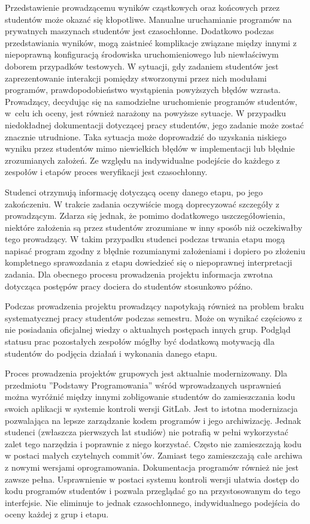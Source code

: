 Przedstawienie prowadzącemu wyników cząstkowych oraz końcowych przez studentów może okazać się kłopotliwe.
Manualne uruchamianie programów na prywatnych maszynach studentów jest czasochłonne.
Dodatkowo podczas przedstawiania wyników, mogą zaistnieć komplikacje związane między innymi z niepoprawną konfiguracją środowiska uruchomieniowego lub niewłaściwym doborem przypadków testowych.
W sytuacji, gdy zadaniem studentów jest zaprezentowanie interakcji pomiędzy stworzonymi przez nich modułami programów, prawdopodobieństwo wystąpienia powyższych błędów wzrasta.
Prowadzący, decydując się na samodzielne uruchomienie programów studentów, w~celu ich oceny, jest również narażony na powyższe sytuacje.
W przypadku niedokładnej dokumentacji dotyczącej pracy studentów, jego zadanie może zostać znacznie utrudnione.
Taka sytuacja może doprowadzić do uzyskania niskiego wyniku przez studentów mimo niewielkich błędów w implementacji lub błędnie zrozumianych założeń.
Ze względu na indywidualne podejście do każdego z zespołów i etapów proces weryfikacji jest czasochłonny.

Studenci otrzymują informację dotyczącą oceny danego etapu, po jego zakończeniu.
W trakcie zadania oczywiście mogą doprecyzować szczegóły z prowadzącym.
Zdarza się jednak, że pomimo dodatkowego uszczegółowienia, niektóre założenia są przez studentów zrozumiane w inny sposób niż oczekiwałby tego prowadzący.
W takim przypadku studenci podczas trwania etapu mogą napisać program zgodny z błędnie rozumianymi założeniami i dopiero po złożeniu kompletnego sprawozdania z etapu dowiedzieć się o niepoprawnej interpretacji zadania.
Dla obecnego procesu prowadzenia projektu informacja zwrotna dotycząca postępów pracy dociera do studentów stosunkowo późno.

Podczas prowadzenia projektu prowadzący napotykają również na problem braku systematycznej pracy studentów podczas semestru.
Może on wynikać częściowo z nie posiadania oficjalnej wiedzy o aktualnych postępach innych grup.
Podgląd statusu prac pozostałych zespołów mógłby być dodatkową motywacją dla studentów do podjęcia działań i wykonania danego etapu.

Proces prowadzenia projektów grupowych jest aktualnie modernizowany.
Dla przedmiotu ”Podstawy Programowania” wśród wprowadzanych usprawnień można wyróżnić między innymi zobligowanie studentów do zamieszczania kodu swoich aplikacji w systemie kontroli wersji GitLab.
Jest to istotna modernizacja pozwalająca na lepsze zarządzanie kodem programów i jego archiwizację.
Jednak studenci (zwłaszcza pierwszych lat studiów) nie potrafią w pełni wykorzystać zalet tego narzędzia i poprawnie z niego korzystać.
Często nie zamieszczają kodu w postaci małych czytelnych commit'ów.
Zamiast tego zamieszczają całe archiwa z nowymi wersjami oprogramowania.
Dokumentacja programów również nie jest zawsze pełna.
Usprawnienie w postaci systemu kontroli wersji ułatwia dostęp do kodu programów studentów i pozwala przeglądać go na przystosowanym do tego interfejsie.
Nie eliminuje to jednak czasochłonnego, indywidualnego podejścia do oceny każdej z grup i etapu.


